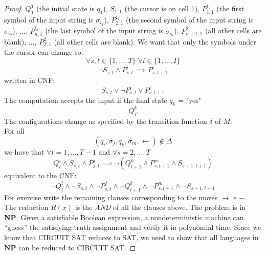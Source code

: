 \documentclass[12pt]{article}
\newcommand{\ra}{\rightarrow}
\newcommand{\la}{\leftarrow}
\begin{document}
\begin{proof}
 $Q^1_1$ (the initial state is $q_1$), $S_{1,1}$ (the cursor is on cell 1), $P^{i_1}_{1,1}$ (the first symbol of the input string is $\sigma_{i_1}$), $P^{i_2}_{2,1}$ (the second symbol of the input string is $\sigma_{i_2}$), $\dots$, $P^{i_n}_{n,1}$ (the last symbol of the input string is $\sigma_{i_n}$), $P^2_{n+1,1}$ (all other cells are blank), $\dots$, $P^2_{T,1}$ (all other cells are blank). We want that only the symbols under the cursor can change so:
 $$\forall s,t\in\{1,\dots,T\}\; \forall i\in\{1,\dots,I\}$$
 $$\neg S_{s,t}\land P^i_{s,t}\implies P^i_{s,t+1}$$
 written in CNF: 
 $$S_{s,t}\lor \neg P^i_{s,t}\lor P^i_{s,t+1}$$
  The computation accepts the input if the final state $q_k$ = "yes"
  $$Q^k_T$$
  The configurations change as specified by the transition function $\delta$ of $M$. \\
  For all $$(q_i,\sigma_j,q_k,\sigma_m,\la)\not\in\Delta$$
  we have that $\forall t=1,\dots,T-1$ and $\forall s=2,\dots,T$
  $$ Q^i_t\land S_{s,t}\land P^j_{s,t}\implies\neg(Q^k_{t+1}\land P^m_{s,t+1}\land S_{s-1,t+1})$$
  equivalent to the CNF:
  $$\neg Q^i_t\land \neg S_{s,t}\land \neg P^j_{s,t}\land\neg Q^k_{t+1}\land \neg P^m_{s,t+1}\land \neg S_{s-1,t+1}$$
For exercise write the remaining clauses corresponding to the moves $\ra$ e $-$.\\
The reduction $R(x)$ is the \emph{AND} of all the clauses above.
The problem is in \textbf{NP}: Given a satisfiable Boolean expression, a nondeterministic machine can ``guess'' the satisfying truth assignment and verify it in polynomial time. Since we know that \textsc{CIRCUIT SAT} reduces to \textsc{SAT}, we need to show that all languages in $\mathbf{NP}$ can be reduced to \textsc{CIRCUIT SAT}.


\end{proof}
\end{document}
